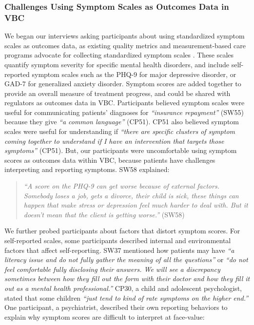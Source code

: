 \subsubsection{Challenges Using Symptom Scales as Outcomes Data in VBC}
\label{sec:findings:preparation:symptoms}

We began our interviews asking participants about using standardized symptom scales as outcomes data, as existing quality metrics and measurement-based care programs advocate for collecting standardized symptom scales \cite{morden_health_2022, jacobs_aligning_2023}.
These scales quantify symptom severity for specific mental health disorders, and include self-reported symptom scales such as the PHQ-9 for major depressive disorder, or GAD-7 for generalized anxiety disorder.
Symptom scores are added together to provide an overall measure of treatment progress, and could be shared with regulators as outcomes data in VBC.
Participants believed symptom scales were useful for communicating patients' diagnoses for \textit{``insurance repayment''} (SW55) because they give \textit{``a common language''} (CP51).
CP51 also believed symptom scales were useful for understanding if \textit{``there are specific clusters of symptom coming together to understand 
if I have an intervention that targets those symptoms''} (CP51).
But, our participants were uncomfortable using symptom scores as outcomes data within VBC, because patients have challenges interpreting and reporting symptoms.
SW58 explained:

\begin{quote}
    \textit{
    ``A score on the PHQ-9 can get worse because of external factors. 
    Somebody loses a job, gets a divorce, their child is sick, these things can happen that make stress or depression feel much harder to deal with.
    But it doesn't mean that the client is getting worse.''} (SW58)
\end{quote}

We further probed participants about factors that distort symptom scores.
For self-reported scales, some participants described internal and environmental factors that affect self-reporting.
SW37 mentioned how patients may have \textit{``a literacy issue and do not fully gather the meaning of all the questions''} or \textit{``do not feel comfortable fully disclosing their answers. We will see a discrepancy sometimes between how they fill out the form with their doctor and how they fill it out as a mental health professional.''}
CP30, a child and adolescent psychologist, stated that some children \textit{``just tend to kind of rate symptoms on the higher end.''}
One participant, a psychiatrist, described their own reporting behaviors to explain why symptom scores are difficult to interpret at face-value:

